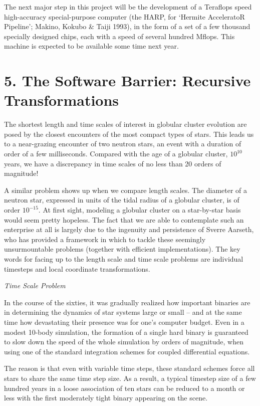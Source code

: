 The next major step in this project will be the development of a
Teraflops speed high-accuracy special-purpose computer (the HARP, for
`Hermite AcceleratoR Pipeline'; Makino, Kokubo \& Taiji 1993), in the
form of a set of a few thousand specially designed chips, each with a
speed of several hundred Mflops.  This machine is expected to be
available some time next year.

\section{5. The Software Barrier: Recursive Transformations}

The shortest length and time scales of interest in globular cluster
evolution are posed by the closest encounters of the most compact
types of stars.  This leads us to a near-grazing encounter of two
neutron stars, an event with a duration of order of a few
milliseconds.  Compared with the age of a globular cluster, $10^{10}$
years, we have a discrepancy in time scales of no less than 20 orders
of magnitude!

A similar problem shows up when we compare length scales.  The
diameter of a neutron star, expressed in units of the tidal radius of
a globular cluster, is of order $10^{-15}$.  At first sight, modeling
a globular cluster on a star-by-star basis would seem pretty hopeless.
The fact that we are able to contemplate such an enterprise at all is
largely due to the ingenuity and persistence of Sverre Aarseth, who
has provided a framework in which to tackle these seemingly
unsurmountable problems (together with efficient implementations).
The key words for facing up to the length scale and time scale
problems are individual timesteps and local coordinate
transformations.

\bigskip
\noindent
{\it Time Scale Problem}
\medskip

In the course of the sixties, it was gradually realized how important
binaries are in determining the dynamics of star systems large or
small -- and at the same time how devastating their presence was for
one's computer budget.  Even in a modest 10-body simulation, the
formation of a single hard binary is guaranteed to slow down the speed
of the whole simulation by orders of magnitude, when using one of the
standard integration schemes for coupled differential equations.

The reason is that even with variable time steps, these standard
schemes force all stars to share the same time step size.  As a
result, a typical timestep size of a few hundred years in a loose
association of ten stars can be reduced to a month or less with the
first moderately tight binary appearing on the scene.

